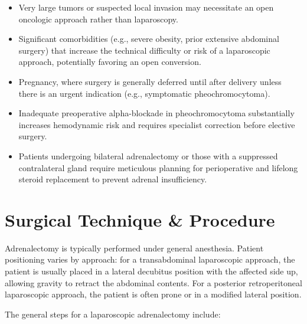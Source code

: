 \begin{itemize}
  \item Very large tumors or suspected local invasion may necessitate an open oncologic approach rather than laparoscopy.
  \item Significant comorbidities (e.g., severe obesity, prior extensive abdominal surgery) that increase the technical difficulty or risk of a laparoscopic approach, potentially favoring an open conversion.
  \item Pregnancy, where surgery is generally deferred until after delivery unless there is an urgent indication (e.g., symptomatic pheochromocytoma).
  \item Inadequate preoperative alpha-blockade in pheochromocytoma substantially increases hemodynamic risk and requires specialist correction before elective surgery.
  \item Patients undergoing bilateral adrenalectomy or those with a suppressed contralateral gland require meticulous planning for perioperative and lifelong steroid replacement to prevent adrenal insufficiency.
\end{itemize}

\section*{Surgical Technique \& Procedure}
Adrenalectomy is typically performed under general anesthesia. Patient positioning varies by approach: for a transabdominal laparoscopic approach, the patient is usually placed in a lateral decubitus position with the affected side up, allowing gravity to retract the abdominal contents. For a posterior retroperitoneal laparoscopic approach, the patient is often prone or in a modified lateral position.

The general steps for a laparoscopic adrenalectomy include:


